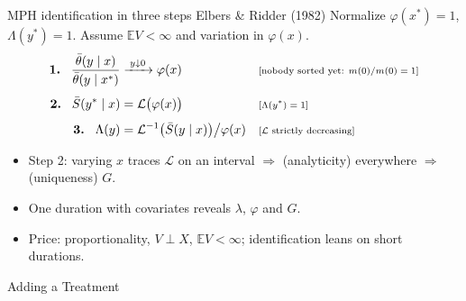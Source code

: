 \documentclass[aspectratio=169,10pt]{beamer}
\newcommand{\E}{\mathbb{E}}
\newcommand{\Lap}{\mathcal{L}}
\newcommand{\why}[1]{\text{\scriptsize[#1]}}
\begin{document}
\begin{frame}[label=m-er]{MPH identification in three steps \hfill {\small Elbers \& Ridder (1982)}}
  Normalize $\varphi(x^*)=1$, $\Lambda(y^*)=1$. Assume $\E V<\infty$ and variation in $\varphi(x)$.
  \begin{align*}
    \textbf{1. }\ \frac{\bar\theta(y\mid x)}{\bar\theta(y\mid x^*)} &\xrightarrow{\;y\downarrow0\;}\varphi(x) && \why{nobody sorted yet: $m(0)/m(0)=1$} \\[4pt]
    \textbf{2. }\ \bar S(y^*\mid x) &= \Lap\big(\varphi(x)\big) && \why{$\Lambda(y^*)=1$} \\[4pt]
    \textbf{3. }\ \Lambda(y) &= \Lap^{-1}\big(\bar S(y\mid x)\big)\big/\varphi(x) && \why{$\Lap$ strictly decreasing}
  \end{align*}
  \begin{itemize}
    \item Step 2: varying $x$ traces $\Lap$ on an interval $\Rightarrow$ (analyticity) everywhere $\Rightarrow$ (uniqueness) $G$.
    \item One duration with covariates reveals $\lambda$, $\varphi$ and $G$.
    \item Price: proportionality, $V\perp X$, $\E V<\infty$; identification leans on short durations.
  \end{itemize}
  \vfill\hfill\hyperlink{p-er}{}
\end{frame}

\begin{frame}
  \centering\Huge Adding a Treatment
\end{frame}

\end{document}
